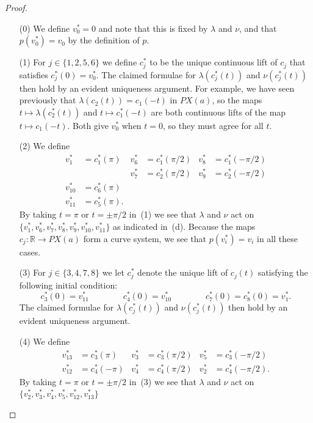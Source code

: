 \documentclass[reqno]{amsart}
\newcommand{\lm}        {\lambda}
\newcommand{\R}         {{\mathbb{R}}}
\renewcommand{\:}{\colon}
\theoremstyle{definition}
\begin{document}
\begin{proof}\leavevmode
 \begin{itemize}
  \item[(0)] We define $v^*_0=0$ and note that this is fixed by $\lm$
   and $\nu$, and that $p(v_0^*)=v_0$ by the definition of $p$.
  \item[(1)] For $j\in\{1,2,5,6\}$ we define $c_j^*$ to be the unique
   continuous lift of $c_j$ that satisfies $c^*_j(0)=v^*_0$.  The
   claimed formulae for $\lm(c^*_j(t))$ and $\nu(c^*_j(t))$ then hold
   by an evident uniqueness argument.  For example, we have seen
   previously that $\lm(c_2(t))=c_1(-t)$ in $PX(a)$, so the maps
   $t\mapsto\lm(c_2^*(t))$ and $t\mapsto c^*_1(-t)$ are both
   continuous lifts of the map $t\mapsto c_1(-t)$.  Both give $v^*_0$
   when $t=0$, so they must agree for all $t$.
  \item[(2)] We define
   \begin{align*}
    v^*_1 &= c_1^*(\pi) &
    v^*_6 &= c_1^*(\pi/2) &
    v^*_8 &= c_1^*(-\pi/2) \\
          & &
    v^*_7 &= c_2^*(\pi/2) &
    v^*_9 &= c_2^*(-\pi/2) \\
    v^*_{10} &= c^*_6(\pi) \\
    v^*_{11} &= c^*_5(\pi).
   \end{align*}
   By taking $t=\pi$ or $t=\pm\pi/2$ in~(1) we see that $\lm$ and
   $\nu$ act on $\{v^*_1,v^*_6,v^*_7,v^*_8,v^*_9,v^*_{10},v^*_{11}\}$
   as indicated in~(d).  Because the maps $c_j\:\R\to PX(a)$ form a
   curve system, we see that $p(v^*_i)=v_i$ in all these cases.
  \item[(3)] For $j\in\{3,4,7,8\}$ we let $c^*_j$ denote the unique
   lift of $c_j(t)$ satisfying the following initial condition:
   \[ c_3^*(0) = v_{11}^* \hspace{4em}
      c_4^*(0) = v_{10}^* \hspace{4em}
      c_7^*(0) = c_8^*(0) = v_1^*.
   \]
   The claimed formulae for $\lm(c^*_j(t))$ and $\nu(c^*_j(t))$ then
   hold by an evident uniqueness argument.
  \item[(4)] We define
   \begin{align*}
    v^*_{13} &= c_3^*(\pi) &
    v^*_3 &= c_3^*(\pi/2) &
    v^*_5 &= c_3^*(-\pi/2) \\
    v^*_{12} &= c_4^*(-\pi) &
    v^*_4 &= c_4^*(\pi/2) &
    v^*_2 &= c_4^*(-\pi/2).
   \end{align*}
   By taking $t=\pi$ or $t=\pm\pi/2$ in~(3) we see that $\lm$ and
   $\nu$ act on $\{v^*_2,v^*_3,v^*_4,v^*_5,v^*_{12},v^*_{13}\}$

\end{itemize}
\end{proof}
\end{document}
